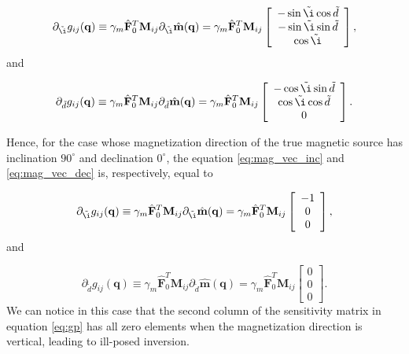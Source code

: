 \begin{equation}
\partial_{\tilde{\i}} g_{ij} (\mathbf{q})  \equiv \gamma_m \hat{\mathbf{F}}_0^T \mathbf{M}_{ij}  \partial_{\tilde{\i}} \hat{\mathbf{m}}(\mathbf{q}) =  \gamma_m \hat{\mathbf{F}}_0^T \mathbf{M}_{ij} 
	\left[ \begin{array}{c}
		-\sin \tilde{\i} \cos \tilde{d} \\
		-\sin \tilde{\i} \sin \tilde{d}\\
		 \cos \tilde{\i}
	\end{array} \right], 
	\label{eq:mag_vec_inc}
\end{equation}
and 

\begin{equation}
	\partial_{\tilde{d}} g_{ij} (\mathbf{q})  \equiv \gamma_m \hat{\mathbf{F}}_0^T \mathbf{M}_{ij}  \partial_{\tilde{d}} \hat{\mathbf{m}}(\mathbf{q}) =  \gamma_m \hat{\mathbf{F}}_0^T \mathbf{M}_{ij} 
	\left[ \begin{array}{c}
		-\cos \tilde{\i} \sin \tilde{d} \\
		\cos \tilde{\i} \cos \tilde{d}\\
		0
	\end{array} \right]. 
	\label{eq:mag_vec_dec}
\end{equation}

Hence, for the case whose magnetization direction of the true magnetic source has inclination $90^\circ$ and declination $0^\circ$, the equation \ref{eq:mag_vec_inc} and \ref{eq:mag_vec_dec} is, respectively, equal to 

 
\begin{equation}
\partial_{\tilde{\i}} g_{ij} (\mathbf{q})  \equiv \gamma_m \hat{\mathbf{F}}_0^T \mathbf{M}_{ij}  \partial_{\tilde{\i}} \hat{\mathbf{m}}(\mathbf{q}) =  \gamma_m \hat{\mathbf{F}}_0^T \mathbf{M}_{ij} 
	\left[ \begin{array}{c}
		-1 \\
		 0 \\
		 0
	\end{array} \right], 
	\label{eq:mag_vec_inc_90}
\end{equation}
and 

\begin{equation}
	\partial_{\tilde{d}} g_{ij} (\mathbf{q})  \equiv \gamma_m \hat{\mathbf{F}}_0^T \mathbf{M}_{ij}  \partial_{\tilde{d}} \hat{\mathbf{m}}(\mathbf{q}) =  \gamma_m \hat{\mathbf{F}}_0^T \mathbf{M}_{ij}
	\left[ \begin{array}{c}
		0 \\
		0 \\
		0
	\end{array} \right]. 
	\label{eq:mag_vec_dec_0}
\end{equation}
We can notice in this case that the second column of the sensitivity matrix in equation \ref{eq:gp} has all zero elements when the magnetization direction is vertical, leading to ill-posed inversion.

           



